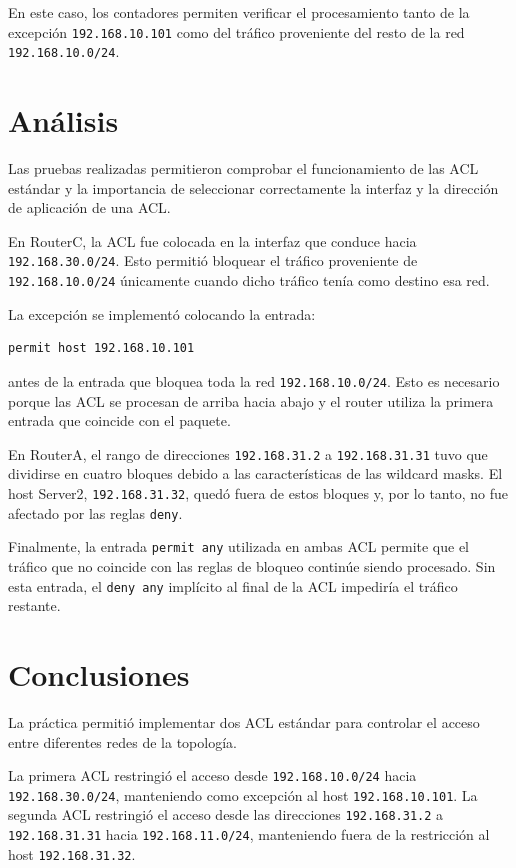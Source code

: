 \documentclass[12pt]{article}
\begin{document}
En este caso, los contadores permiten verificar el procesamiento tanto de la
excepción \texttt{192.168.10.101} como del tráfico proveniente del resto de
la red \texttt{192.168.10.0/24}.

\section{Análisis}

Las pruebas realizadas permitieron comprobar el funcionamiento de las ACL
estándar y la importancia de seleccionar correctamente la interfaz y la
dirección de aplicación de una ACL.

En RouterC, la ACL fue colocada en la interfaz que conduce hacia
\texttt{192.168.30.0/24}. Esto permitió bloquear el tráfico proveniente de
\texttt{192.168.10.0/24} únicamente cuando dicho tráfico tenía como destino
esa red.

La excepción se implementó colocando la entrada:

\begin{verbatim}
permit host 192.168.10.101
\end{verbatim}

antes de la entrada que bloquea toda la red
\texttt{192.168.10.0/24}. Esto es necesario porque las ACL se procesan de
arriba hacia abajo y el router utiliza la primera entrada que coincide con el
paquete.

En RouterA, el rango de direcciones \texttt{192.168.31.2} a
\texttt{192.168.31.31} tuvo que dividirse en cuatro bloques debido a las
características de las wildcard masks. El host Server2,
\texttt{192.168.31.32}, quedó fuera de estos bloques y, por lo tanto, no fue
afectado por las reglas \texttt{deny}.

Finalmente, la entrada \texttt{permit any} utilizada en ambas ACL permite que
el tráfico que no coincide con las reglas de bloqueo continúe siendo
procesado. Sin esta entrada, el \texttt{deny any} implícito al final de la
ACL impediría el tráfico restante.

\section{Conclusiones}

La práctica permitió implementar dos ACL estándar para controlar el acceso
entre diferentes redes de la topología.

La primera ACL restringió el acceso desde
\texttt{192.168.10.0/24} hacia \texttt{192.168.30.0/24}, manteniendo como
excepción al host \texttt{192.168.10.101}. La segunda ACL restringió el acceso
desde las direcciones \texttt{192.168.31.2} a
\texttt{192.168.31.31} hacia \texttt{192.168.11.0/24}, manteniendo fuera de
la restricción al host \texttt{192.168.31.32}.
\end{document}
